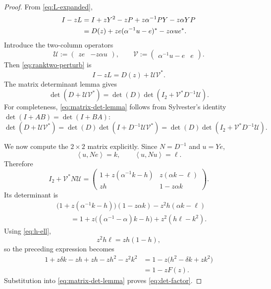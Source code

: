 \documentclass[11pt]{article}
\newcommand{\ip}[2]{\left\langle #1,#2\right\rangle}
\begin{document}
\begin{proof}
From \eqref{eq:L-expanded},
\begin{align}
   I-zL
   &=I+zY^2-zP+z\alpha^{-1}PY-z\alpha YP\notag\\
   &=D(z)+ze(\alpha^{-1}u-e)^*-z\alpha u e^*.
   \label{eq:ranktwo-perturb}
\end{align}
Introduce the two-column operators
\[
   \mathcal U
   :=\begin{pmatrix}ze&-z\alpha u\end{pmatrix},
   \qquad
   \mathcal V
   :=\begin{pmatrix}\alpha^{-1}u-e&e\end{pmatrix}.
\]
Then \eqref{eq:ranktwo-perturb} is
\[
   I-zL=D(z)+\mathcal U\mathcal V^*.
\]
The matrix determinant lemma gives
\begin{equation}
   \det(D+\mathcal U\mathcal V^*)
   =\det(D)\det(I_2+\mathcal V^*D^{-1}\mathcal U).
   \label{eq:matrix-det-lemma}
\end{equation}
For completeness, \eqref{eq:matrix-det-lemma} follows from Sylvester's identity
$\det(I+AB)=\det(I+BA)$:
\[
   \det(D+\mathcal U\mathcal V^*)
   =\det(D)\det(I+D^{-1}\mathcal U\mathcal V^*)
   =\det(D)\det(I_2+\mathcal V^*D^{-1}\mathcal U).
\]

We now compute the $2\times2$ matrix explicitly.  Since $N=D^{-1}$ and $u=Ye$,
\[
   \ip{u}{Ne}=k,
   \qquad
   \ip{u}{Nu}=\ell.
\]
Therefore
\begin{equation}
   I_2+\mathcal V^*N\mathcal U
   =
   \begin{pmatrix}
      1+z(\alpha^{-1}k-h) & z(\alpha k-\ell)\\
      zh & 1-z\alpha k
   \end{pmatrix}.
   \label{eq:2by2}
\end{equation}
Its determinant is
\begin{align*}
 &\bigl(1+z(\alpha^{-1}k-h)\bigr)(1-z\alpha k)
   -z^2h(\alpha k-\ell)\\
 &\qquad
 =1+z\bigl((\alpha^{-1}-\alpha)k-h\bigr)
   +z^2(h\ell-k^2).
\end{align*}
Using \eqref{eq:h-ell},
\[
   z^2h\ell=zh(1-h),
\]
so the preceding expression becomes
\begin{align*}
   1+z\delta k-zh+zh-zh^2-z^2k^2
   &=1-z\bigl(h^2-\delta k+zk^2\bigr)\\
   &=1-zF(z).
\end{align*}
Substitution into \eqref{eq:matrix-det-lemma} proves \eqref{eq:det-factor}.
\end{proof}
\end{document}

